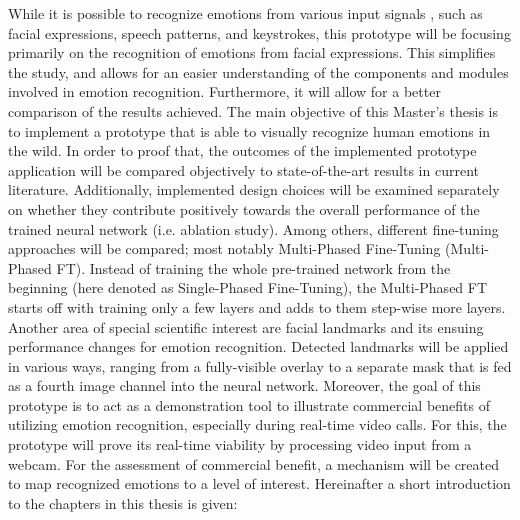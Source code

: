 While it is possible to recognize emotions from various input signals \citep{Akcay:2020:SpeechEmotionRecognition(SER)}, such as facial expressions, speech patterns, and keystrokes, this prototype will be focusing primarily on the recognition of emotions from facial expressions. This simplifies the study, and allows for an easier understanding of the components and modules involved in emotion recognition. Furthermore, it will allow for a better comparison of the results achieved. 
\newline\newline
The main objective of this Master's thesis is to implement a prototype that is able to visually recognize human emotions in the wild. In order to proof that, the outcomes of the implemented prototype application will be compared objectively to state-of-the-art results in current literature.
\newline\newline
Additionally, implemented design choices will be examined separately on whether they contribute positively towards the overall performance of the trained neural network (i.e. ablation study). Among others, different fine-tuning approaches will be compared; most notably Multi-Phased Fine-Tuning (Multi-Phased FT). Instead of training the whole pre-trained network from the beginning (here denoted as Single-Phased Fine-Tuning), the Multi-Phased FT starts off with training only a few layers and adds to them step-wise more layers.
\newline\newline
Another area of special scientific interest are facial landmarks and its ensuing performance changes for emotion recognition. Detected landmarks will be applied in various ways, ranging from a fully-visible overlay to a separate mask that is fed as a fourth image channel into the neural network.
\newline\newline
Moreover, the goal of this prototype is to act as a demonstration tool to illustrate commercial benefits of utilizing emotion recognition, especially during real-time video calls. For this, the prototype will prove its real-time viability by processing video input from a webcam. For the assessment of commercial benefit, a mechanism will be created to map recognized emotions to a level of interest.
\newline\newline
Hereinafter a short introduction to the chapters in this thesis is given:\newline
